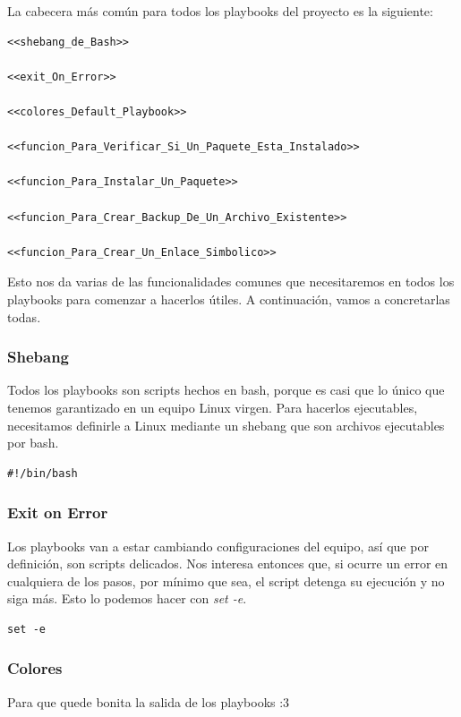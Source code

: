 \documentclass[11pt]{article}
\begin{document}
La cabecera más común para todos los playbooks del proyecto es la siguiente:

\begin{verbatim}
<<shebang_de_Bash>>

<<exit_On_Error>>

<<colores_Default_Playbook>>

<<funcion_Para_Verificar_Si_Un_Paquete_Esta_Instalado>>

<<funcion_Para_Instalar_Un_Paquete>>

<<funcion_Para_Crear_Backup_De_Un_Archivo_Existente>>

<<funcion_Para_Crear_Un_Enlace_Simbolico>>

\end{verbatim}

Esto nos da varias de las funcionalidades comunes que necesitaremos en todos los playbooks para comenzar a hacerlos útiles. A continuación, vamos a concretarlas todas.
\subsubsection{Shebang}
\label{sec:orge5f0f12}

Todos los playbooks son scripts hechos en bash, porque es casi que lo único que tenemos garantizado en un equipo Linux virgen. Para hacerlos ejecutables, necesitamos definirle a Linux mediante un shebang que son archivos ejecutables por bash.

\begin{verbatim}
#!/bin/bash
\end{verbatim}
\subsubsection{Exit on Error}
\label{sec:org80f76a7}

Los playbooks van a estar cambiando configuraciones del equipo, así que por definición, son scripts delicados. Nos interesa entonces que, si ocurre un error en cualquiera de los pasos, por mínimo que sea, el script detenga su ejecución y no siga más. Esto lo podemos hacer con \emph{set -e}.

\begin{verbatim}
set -e
\end{verbatim}
\subsubsection{Colores}
\label{sec:org4ebe0d8}

Para que quede bonita la salida de los playbooks :3
\end{document}
